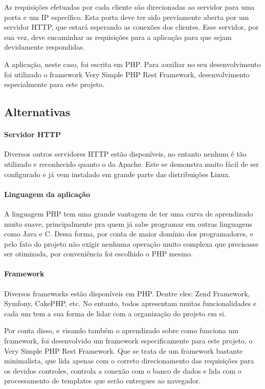 \documentclass[graduacao,brazil]{ThesisPUC}
\begin{document}
As requisições efetuadas por cada cliente são direcionadas ao servidor para uma porta e um IP específico. Esta porta deve ter sido previamente aberta por um servidor HTTP, que estará esperando as conexões dos clientes. Esse servidor, por sua vez, deve encaminhar as requisições para a aplicação para que sejam devidamente respondidas.

A aplicação, neste caso, foi escrita em PHP. Para auxiliar no seu desenvolvimento foi utilizado o framework Very Simple PHP Rest Framework\cite{RestFW}, desenvolvimento especialmente para este projeto.

\subsection{Alternativas}

\paragraph{Servidor HTTP}

Diversos outros servidores HTTP estão disponíveis, no entanto nenhum é tão utilizado e reconhecido quanto o da Apache. Este se demonstra muito fácil de ser configurado e já vem instalado em grande parte das distribuições Linux.

\paragraph{Linguagem da aplicação}

A linguagem PHP tem uma grande vantagem de ter uma curva de aprendizado muito suave, principalmente pra quem já sabe programar em outras linguagens como Java e C. Dessa forma, por conta de maior domínio dos programadores, e pelo fato do projeto não exigir nenhuma operação muito complexa que precisasse ser otimizada, por conveniência foi escolhido o PHP mesmo.

\paragraph{Framework}

Diversos frameworks estão disponíveis em PHP. Dentre eles: Zend Framework, Symfony, CakePHP, etc. No entanto, todos apresentam muitas funcionalidades e cada um tem a sua forma de lidar com a organização do projeto em si. 

Por conta disso, e visando também o aprendizado sobre como funciona um framework, foi desenvolvido um framework especificamente para este projeto, o Very Simple PHP Rest Framework\cite{RestFW}. Que se trata de um framework bastante minimalista, que lida apenas com o correto direcionamento das requisições para os devidos controles, controla a conexão com o banco de dados e lida com o processamento de templates que serão entregues ao navegador.
\end{document}

